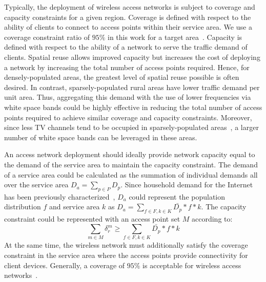 Typically, the deployment of wireless access networks is subject to coverage and capacity constraints 
for a given region. Coverage is defined with respect to the ability of clients to connect to access 
points within their service area.  We use a coverage constraint ratio of $95\%$ in this work for a 
target area~\cite{robinson2010deploying}. Capacity is defined with respect to the ability of a network 
to serve the traffic demand of clients. Spatial reuse allows improved capacity but increases the cost
of deploying a network by increasing the total number of access points required. Hence, for densely-populated 
areas, the greatest level of spatial reuse possible is often desired. In contrast, sparsely-populated 
rural areas have lower traffic demand per unit area.  Thus, aggregating this demand with the use of lower 
frequencies via white space bands could be highly effective in reducing the total number of access points 
required to achieve similar coverage and capacity constraints.  Moreover, since less TV channels tend to 
be occupied in sparsely-populated areas~\cite{msdatabase}, a larger number of white space bands can be 
leveraged in these areas.

An access network deployment should ideally provide network capacity equal to the demand of the service 
area to maintain the capacity constraint. The demand of a service area could be calculated as the 
summation of individual demands all over the service area $D_a=\sum_{p\in P}D_p$. Since household demand 
for the Internet has been previously characterized~\cite{rosston2011household}, $D_a$ could represent the 
population distribution $f$ and service area $k$ as $D_a=\sum_{f \in F,k \in K}\bar{D_p}*f*k$. The capacity 
constraint could be represented with an access point set $M$ according to:
\begin{equation}
\label{eq:nlbound}
\sum_{m \in M}\delta_r^m \ge \sum_{f \in F,k \in K}\bar{D_p}*f*k
\end{equation}
At the same time, the wireless network must additionally satisfy the coverage constraint in the service 
area where the access points provide connectivity for client devices. Generally, a coverage of $95\%$ is 
acceptable for wireless access networks~\cite{robinson2010deploying}.



